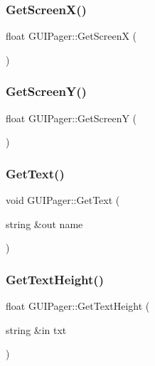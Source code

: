 \hypertarget{class_g_u_i_pager_ac5b8b425dbc8e907e7277bfcda59d011}{}\label{class_g_u_i_pager_ac5b8b425dbc8e907e7277bfcda59d011} 
\subsubsection{\texorpdfstring{Get\+Screen\+X()}{GetScreenX()}}
{\footnotesize\ttfamily float G\+U\+I\+Pager\+::\+Get\+ScreenX (\begin{DoxyParamCaption}{ }\end{DoxyParamCaption})}

\hypertarget{class_g_u_i_pager_a6c6792b4e06a3ab3281ec5a25312f93d}{}\label{class_g_u_i_pager_a6c6792b4e06a3ab3281ec5a25312f93d} 
\subsubsection{\texorpdfstring{Get\+Screen\+Y()}{GetScreenY()}}
{\footnotesize\ttfamily float G\+U\+I\+Pager\+::\+Get\+ScreenY (\begin{DoxyParamCaption}{ }\end{DoxyParamCaption})}

\hypertarget{class_g_u_i_pager_ad064d25033f28c7dcca09c1e0e8123bd}{}\label{class_g_u_i_pager_ad064d25033f28c7dcca09c1e0e8123bd} 
\subsubsection{\texorpdfstring{Get\+Text()}{GetText()}}
{\footnotesize\ttfamily void G\+U\+I\+Pager\+::\+Get\+Text (\begin{DoxyParamCaption}\item[{string \&out}]{name }\end{DoxyParamCaption})}

\hypertarget{class_g_u_i_pager_ae0658a6a8f63a60c8c0668d95d86dda2}{}\label{class_g_u_i_pager_ae0658a6a8f63a60c8c0668d95d86dda2} 
\subsubsection{\texorpdfstring{Get\+Text\+Height()}{GetTextHeight()}}
{\footnotesize\ttfamily float G\+U\+I\+Pager\+::\+Get\+Text\+Height (\begin{DoxyParamCaption}\item[{string \&in}]{txt }\end{DoxyParamCaption})}

